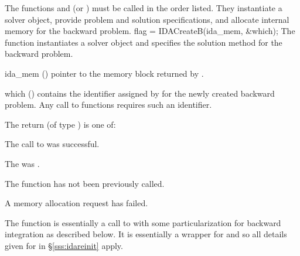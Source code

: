 The functions  and  (or ) must be 
called in the order listed. They instantiate a {\idas} solver object, provide problem 
and solution specifications, and allocate internal memory for the backward problem.
{
  flag = IDACreateB(ida\_mem, \&which);
}
{
  The function  instantiates a {\idas} solver object and specifies 
  the solution method for the backward problem.
}
{
  \begin{args}
  \item[ida\_mem] ()
    pointer to the {\idas} memory block returned by .
  \item[which] ()
    contains the identifier assigned by {\idas} for the newly created backward 
    problem. Any call to  functions requires such an identifier.
  \end{args}
}
{
   The return  (of type ) is one of:
   \begin{args}
   \item[\Id{IDA\_SUCCESS}]
     The call to  was successful.
   \item[\Id{IDA\_MEM\_NULL}]
     The  was .
   \item[\Id{IDA\_NO\_ADJ}]
     The function  has not been previously called.
   \item[\Id{IDA\_MEM\_FAIL}]
     A memory allocation request has failed.
   \end{args}
}
{}
The function  is essentially a call to  with some 
particularization for backward integration as described below. It is essentially 
a wrapper for  and so all details given for  in 
\S\ref{sss:idareinit} apply.

